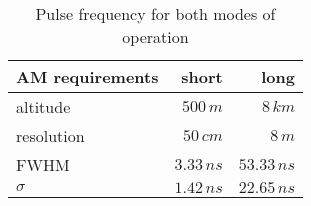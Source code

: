 \begin{table}[H]
\centering
\caption{Pulse frequency for both modes of operation}
\label{tab:AM_requirements}
\begin{tabular}{|l|rr|}\hline
    \textbf{AM requirements} & short & long \\
    \hline 
    altitude & $500\,m$ & $8\,km$ \\
    resolution & $50\,cm$ & $8\,m$ \\
    FWHM & $3.33\,n s$ & $53.33\,n s$ \\
    $\sigma$ & $1.42\,n s$ & $22.65\,n s$ \\
    \hline 
\end{tabular}
\end{table}
